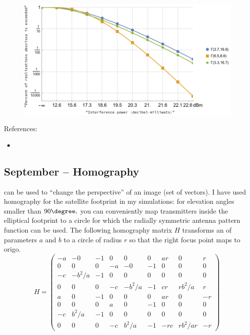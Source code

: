 \documentclass{article}
\begin{document}
\begin{figure}
  \includegraphics[width=\linewidth]{dBplot.png}
\end{figure}


References:
\begin{itemize}
\item {}
\end{itemize}

\subsection{September – Homography}

 can be used to ``change the perspective'' of an image (set of vectors). I have used homography for the satellite footprint in my simulations: for elevation angles smaller than $90 \degree,$ you can conveniently map transmitters inside the elliptical footprint to a circle for which the radially symmetric antenna pattern function can be used. The following homography matrix $H$ transforms an  of parameters $a$ and $b$ to a circle of radius $r$ so that the right focus point maps to origo.
$$
H=
\begin{pmatrix}
  -a &-0 &-1 &0 &0 &0 &ar &0 &r \\
  0 &0 &0 &-a &-0 &-1 & 0& 0 &0 \\
  -c &-b^2/a& -1& 0& 0& 0 &0& 0& 0 \\
  0 &0 &0 &-c &-b^2/a &-1 &cr &rb^2/a& r\\
  a &0 &-1& 0& 0 &0 & ar &0 &-r \\
  0 &0 &0 &a &0 &-1 &0 &0 &0\\
  -c &b^2/a& -1& 0& 0& 0& 0& 0& 0 \\
  0 &0 &0 &-c &b^2/a &-1 &-rc &rb^2/ar &-r 
\end{pmatrix}
$$
\end{document}
